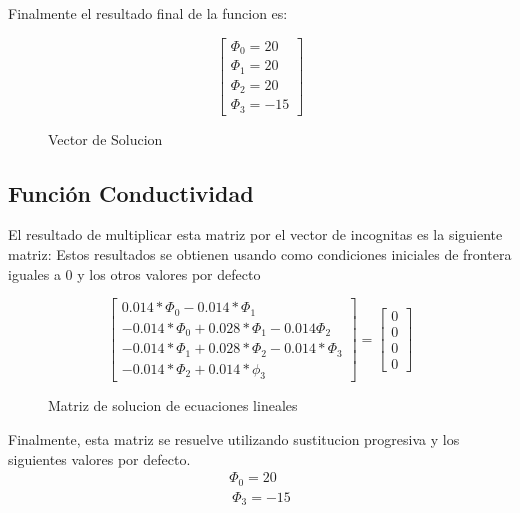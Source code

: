 \documentclass{article}
\begin{document}
Finalmente el resultado final de la funcion es:

\begin{figure}[!h]
    
    \[
        \begin{bmatrix}
            {\Phi_0 = 20}\\
            {\Phi_1 = 20}\\
            {\Phi_2 = 20}\\
            {\Phi_3 = -15}
        \end{bmatrix}
    \]
    \caption{Vector de Solucion}
\end{figure}

\subsection{Función Conductividad}

El resultado de multiplicar esta matriz por el vector de incognitas es la siguiente matriz:
Estos resultados se obtienen usando como condiciones iniciales de frontera iguales a 0 y los otros valores por defecto
\begin{figure}[!h]
    \[
        \begin{bmatrix}
            {0.014*\Phi_0 - 0.014*\Phi_1}\\
            {-0.014*\Phi_0 + 0.028*\Phi_1-0.014\Phi_2}\\
            {-0.014*\Phi_1 + 0.028*\Phi_2 - 0.014*\Phi_3}\\
            {-0.014*\Phi_2 + 0.014*\phi_3}
        \end{bmatrix}
        =
        \begin{bmatrix}
            {0}\\
            {0}\\
            {0}\\
            {0}
        \end{bmatrix}
    \]
    \caption{Matriz de solucion de ecuaciones lineales}
    \end{figure}
Finalmente, esta matriz se resuelve utilizando sustitucion progresiva y los siguientes valores por defecto.
\begin{gather}
        \Phi_0 = 20\\\
        \Phi_3 = -15
\end{gather}
\end{document}
